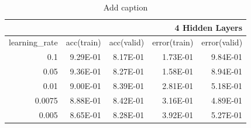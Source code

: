 \documentclass{article}
\begin{document}
\begin{table}[htbp]
  \centering
  \caption{Add caption}
    \begin{tabular}{|r|r|r|r|r|}
    \toprule
    \multicolumn{5}{|p{25em}|}{4 Hidden Layers} \\
    \midrule
    \multicolumn{1}{|r|}{\multirow{2}[2]{*}{learning\_rate}} & \multicolumn{1}{r|}{\multirow{2}[2]{*}{acc(train)}} & \multicolumn{1}{r|}{\multirow{2}[2]{*}{acc(valid)}} & \multicolumn{1}{r|}{\multirow{2}[2]{*}{error(train)}} & \multicolumn{1}{r|}{\multirow{2}[2]{*}{error(valid)}} \\
          &       &       &       &  \\
    \midrule
    \multirow{2}[2]{*}{0.1} & \multirow{2}[2]{*}{9.29E-01} & \multirow{2}[2]{*}{8.17E-01} & \multirow{2}[2]{*}{1.73E-01} & \multirow{2}[2]{*}{9.84E-01} \\
          &       &       &       &  \\
    \midrule
    \multirow{2}[2]{*}{0.05} & \multirow{2}[2]{*}{9.36E-01} & \multirow{2}[2]{*}{8.27E-01} & \multirow{2}[2]{*}{1.58E-01} & \multirow{2}[2]{*}{8.94E-01} \\
          &       &       &       &  \\
    \midrule
    \multirow{2}[2]{*}{0.01} & \multirow{2}[2]{*}{9.00E-01} & \multirow{2}[2]{*}{8.39E-01} & \multirow{2}[2]{*}{2.81E-01} & \multirow{2}[2]{*}{5.18E-01} \\
          &       &       &       &  \\
    \midrule
    \multirow{2}[2]{*}{0.0075} & \multirow{2}[2]{*}{8.88E-01} & \multirow{2}[2]{*}{8.42E-01} & \multirow{2}[2]{*}{3.16E-01} & \multirow{2}[2]{*}{4.89E-01} \\
          &       &       &       &  \\
    \midrule
    \multirow{2}[2]{*}{0.005} & \multirow{2}[2]{*}{8.65E-01} & \multirow{2}[2]{*}{8.28E-01} & \multirow{2}[2]{*}{3.92E-01} & \multirow{2}[2]{*}{5.27E-01} \\
          &       &       &       &  \\
    \bottomrule
    \end{tabular}%
  \label{tab:addlabel}%
\end{table}%
\end{document}
